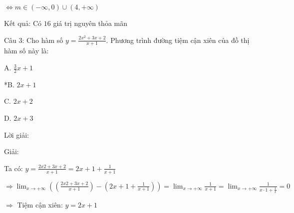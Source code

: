 \documentclass{article}
\begin{document}
\(\Leftrightarrow m \in (-\infty, 0) \cup (4, +\infty)\)

Kết quả: Có \(16\) giá trị nguyên thỏa mãn



Câu 3: Cho hàm số \(y = \frac{2x^2 + 3x + 2}{x + 1}\). Phương trình đường tiệm cận xiên của đồ thị hàm số này là:

A. \(\frac{3}{2}x + 1\)

*B. \(2x + 1\)

C. \(2x + 2\)

D. \(2x + 3\)

Lời giải:

Giải:

Ta có: \(y = \frac{2x{2} + 3x + 2}{x + 1} = 2x + 1 + \frac{1}{x + 1}\)

\(\Rightarrow \displaystyle\lim_{x \to +\infty} \left(\left(\frac{2x{2} + 3x + 2}{x + 1}\right) - \left(2x + 1 + \frac{1}{x + 1}\right)\right) = \displaystyle\lim_{x \to +\infty} \frac{1}{x + 1} = \displaystyle\lim_{x \to +\infty} \frac{1}{x \cdot 1 + \frac{1}{x}} = 0\)

\(\Rightarrow\) Tiệm cận xiên: \(y = 2x + 1\)
\end{document}
